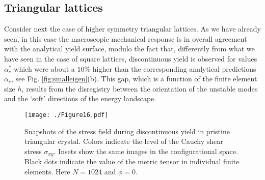 \documentclass[CRPHYS,Unicode,manuscript]{cedram}
\begin{document}


 


%
%
%

\subsection{Triangular lattices}

Consider next the case of higher symmetry triangular lattices. As we have already seen, in this case the macroscopic mechanical response is in overall agreement with the analytical yield surface, modulo  the fact that, differently from what we have seen in the case of square lattices, discontinuous yield  is observed  for values $\alpha_c^*$ which were  about a $10\%$ higher than the corresponding analytical predictions $\alpha_c$, see Fig. \ref{fig:smalleigen}(b). This gap, which is a  function of the finite element size $h$,   results from  the disregistry between the orientation of the unstable modes and the  `soft' directions of  the energy landscape. 

\begin{figure}[h!]
\centering
\texttt{[image: ./Figure16.pdf]}
\caption{\scriptsize {
Snapshots of the stress field during discontinuous yield in pristine triangular  crystal. Colors indicate the level of the Cauchy shear stress $\sigma_{xy}$. Insets show the same images in the configurational space.  Black dots indicate the value of the metric tensor in individual finite elements.
Here $N=1024$ and $\phi=0$.  }
 \label{fig:th0hex}}
\end{figure}
\end{document}
